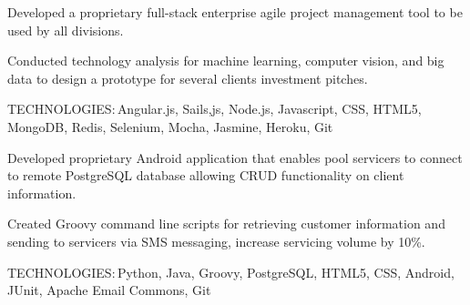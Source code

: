 \documentclass[]{cls}
\def\kt{\vspace*{2pt}\textsc{TECHNOLOGIES:\,}}
\begin{document}
\begin{minipage}[t]{0.66\textwidth}
\sectionsep

\begin{tightemize}
\item Developed a proprietary full-stack enterprise agile project management tool to be used by all divisions.

\item Conducted technology analysis for machine learning, computer vision, and big data to design a prototype for several clients investment pitches.

\end{tightemize}
\kt Angular.js, Sails,js, Node.js, Javascript, CSS, HTML5, MongoDB, Redis, Selenium, Mocha, Jasmine, Heroku, Git



\sectionsep

\begin{tightemize}
\item Developed proprietary Android application that enables pool servicers to connect to remote PostgreSQL database allowing CRUD functionality on client information.

\item Created Groovy command line scripts for retrieving customer information and sending to servicers via SMS messaging, increase servicing volume by 10\%.

\end{tightemize}
\kt Python, Java, Groovy, PostgreSQL, HTML5, CSS, Android, JUnit, Apache Email Commons, Git

\end{minipage} 
\end{document}
